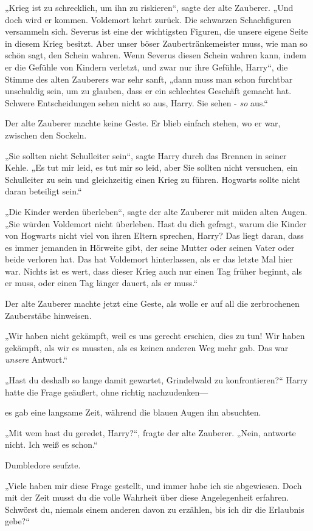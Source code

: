 {„Krieg ist zu schrecklich, um ihn zu riskieren“, sagte der alte Zauberer. „Und doch wird er kommen. Voldemort kehrt zurück. Die schwarzen Schachfiguren versammeln sich. Severus ist eine der wichtigsten Figuren, die unsere eigene Seite in diesem Krieg besitzt. Aber unser böser Zaubertränkemeister muss, wie man so schön sagt, den Schein wahren. Wenn Severus diesen Schein wahren kann, indem er die Gefühle von Kindern verletzt, und zwar nur ihre Gefühle, Harry“, die Stimme des alten Zauberers war sehr sanft, „dann muss man schon furchtbar unschuldig sein, um zu glauben, dass er ein schlechtes Geschäft gemacht hat. Schwere Entscheidungen sehen nicht so aus, Harry. Sie sehen - \emph{so} aus.“

Der alte Zauberer machte keine Geste. Er blieb einfach stehen, wo er war, zwischen den Sockeln.

„Sie sollten nicht Schulleiter sein“, sagte Harry durch das Brennen in seiner Kehle. „Es tut mir leid, es tut mir so leid, aber Sie sollten nicht versuchen, ein Schulleiter zu sein und gleichzeitig einen Krieg zu führen. Hogwarts sollte nicht daran beteiligt sein.“

„Die Kinder werden überleben“, sagte der alte Zauberer mit müden alten Augen. „Sie würden Voldemort nicht überleben. Hast du dich gefragt, warum die Kinder von Hogwarts nicht viel von ihren Eltern sprechen, Harry? Das liegt daran, dass es immer jemanden in Hörweite gibt, der seine Mutter oder seinen Vater oder beide verloren hat. Das hat Voldemort hinterlassen, als er das letzte Mal hier war. Nichts ist es wert, dass dieser Krieg auch nur einen Tag früher beginnt, als er muss, oder einen Tag länger dauert, als er muss.“

Der alte Zauberer machte jetzt eine Geste, als wolle er auf all die zerbrochenen Zauberstäbe hinweisen.

„Wir haben nicht gekämpft, weil es uns gerecht erschien, dies zu tun! Wir haben gekämpft, als wir es mussten, als es keinen anderen Weg mehr gab. Das war \emph{unsere} Antwort.“

„Hast du deshalb so lange damit gewartet, Grindelwald zu konfrontieren?“ Harry hatte die Frage geäußert, ohne richtig nachzudenken—

es gab eine langsame Zeit, während die blauen Augen ihn absuchten.

„Mit wem hast du geredet, Harry?“, fragte der alte Zauberer. „Nein, antworte nicht. Ich weiß es schon.“

Dumbledore seufzte.

„Viele haben mir diese Frage gestellt, und immer habe ich sie abgewiesen. Doch mit der Zeit musst du die volle Wahrheit über diese Angelegenheit erfahren. Schwörst du, niemals einem anderen davon zu erzählen, bis ich dir die Erlaubnis gebe?“

}
